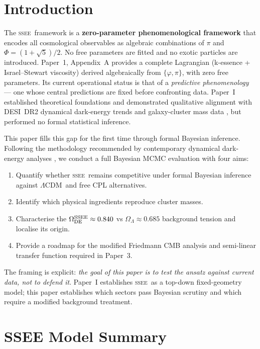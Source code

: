 \documentclass[12pt,a4paper]{article}
\newcommand{\SSEE}{\ifmmode\mathrm{SSEE}\else\textsc{ssee}\fi}
\newcommand{\LCDM}{\ifmmode\Lambda\mathrm{CDM}\else$\Lambda$CDM\fi}
\newcommand{\OmDE}{\Omega_{\mathrm{DE}}}
\begin{document}
\section{Introduction}
\label{sec:intro}

The \SSEE\ framework \citep{SSEE_paperI} is a
\textbf{zero-parameter phenomenological framework} that encodes all
cosmological observables as algebraic combinations of $\pi$ and
$\Phi=(1+\sqrt{5})/2$.
No free parameters are fitted and no exotic particles are introduced.
Paper~1, Appendix~A provides a complete Lagrangian (k-essence + Israel--Stewart
viscosity) derived algebraically from $\{\varphi,\pi\}$, with zero free parameters.
Its current operational status is that of a
\emph{predictive phenomenology} — one whose central predictions are
fixed before confronting data.
Paper~I established theoretical foundations and demonstrated qualitative
alignment with DESI~DR2 dynamical dark-energy trends \citep{DESI_DR2}
and galaxy-cluster mass data \citep{Zhang2026}, but performed no formal
statistical inference.

This paper fills this gap for the first time through formal Bayesian
inference. Following the methodology recommended by contemporary
dynamical dark-energy analyses \citep{DESI_DR2,Moresco2017}, we conduct a
full Bayesian MCMC evaluation with four aims:
\begin{enumerate}
  \item Quantify whether \SSEE\ remains competitive under formal
    Bayesian inference against \LCDM\ and free CPL alternatives.
  \item Identify which physical ingredients reproduce cluster masses.
  \item Characterise the $\OmDE^{\SSEE}\approx0.840$ vs
    $\Omega_\Lambda\approx0.685$ background tension and localise its origin.
  \item Provide a roadmap for the modified Friedmann CMB analysis
    and semi-linear transfer function required in Paper~3.
\end{enumerate}

The framing is explicit: \textit{the goal of this paper is to test the
ansatz against current data, not to defend it}. Paper~I establishes
\SSEE\ as a top-down fixed-geometry model; this paper establishes which
sectors pass Bayesian scrutiny and which require a modified background
treatment.

\section{SSEE Model Summary}
\label{sec:model}
\end{document}
